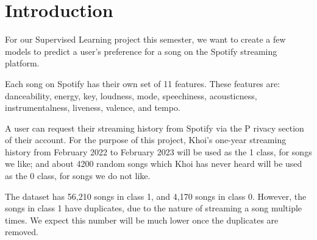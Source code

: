 \section{Introduction}

For our Supervised Learning project this semester, we want to create a few models to predict a user's preference for a song on the Spotify streaming platform.

Each song on Spotify has their own set of 11 features. These features are: danceability, energy, key, loudness, mode, speechiness, acousticness, instrumentalness, liveness, valence, and tempo.

A user can request their streaming history from Spotify via the P rivacy section of their account. For the purpose of this project, Khoi's one-year streaming history from February 2022 
to February 2023 will be used as the 1 class, for songs we like; and about 4200 random songs which Khoi has never heard will be used as the 0 class, for songs we do not like.

The dataset has 56,210 songs in class 1, and 4,170 songs in class 0. However, the songs in class 1 have duplicates, due to the nature of streaming a song multiple times.
We expect this number will be much lower once the duplicates are removed.